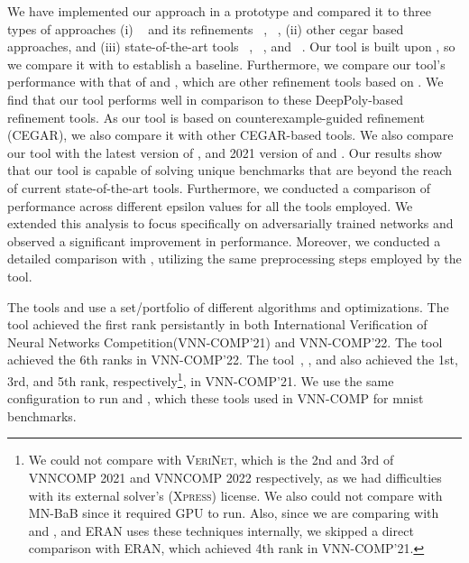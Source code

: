 We have implemented our approach in a prototype and compared it to three types of approaches 
(i) \deeppoly{}~\cite{singh2019abstract} and its refinements \kpoly{}~\cite{singh2019beyond}, \deepsrgr{}~\cite{yang2021improving}, 
(ii) other cegar based approaches, and 
(iii) state-of-the-art tools \alphabeta~\cite{zhang2018efficient,wang2021beta,xu2020fast,zhang2022branch,tjeng2017evaluating}, 
\ovaltool~\cite{bunel2018unified,bunel2020branch,bunel2020lagrangian,de2021scaling,de2021scaling,de2021scaling2,de2021improved}, 
and \marabou~\cite{katz2019marabou}. 
Our tool is built upon \deeppoly{}, so we compare it with \deeppoly{} to establish a baseline. 
Furthermore, we compare our tool's performance with that of \kpoly{} and \deepsrgr{}, 
which are other refinement tools based on \deeppoly{}. 
We find that our tool performs well in comparison to these DeepPoly-based refinement tools.
As our tool is based on counterexample-guided refinement (CEGAR), we also compare it with other CEGAR-based tools. 
We also compare our tool with the latest version of \alphabeta{}, and 2021 version of \ovaltool{} and \marabou{}. 
Our results show that our tool is capable of solving unique benchmarks 
that are beyond the reach of current state-of-the-art tools.
Furthermore, we conducted a comparison of performance across different epsilon values for all the tools employed. 
We extended this analysis to focus specifically on adversarially trained networks and observed a significant improvement 
in performance. Moreover, we conducted a detailed comparison with \alphabeta{}, 
utilizing the same preprocessing steps employed by the \alphabeta{} tool.

The tools \alphabeta{} and \ovaltool{} use a set/portfolio of different algorithms and optimizations.
The tool \alphabeta{} achieved the first rank persistantly in both International Verification of Neural Networks Competition(VNN-COMP'21) and VNN-COMP'22.
The tool \marabou{} achieved the 6th ranks in VNN-COMP'22.  
The tool~\alphabeta{}, \ovaltool{}, and \marabou{} also achieved the 1st, 3rd, and 5th rank, 
respectively\footnote{We could not compare with \textsc{VeriNet}, which is the 2nd and 3rd of VNNCOMP 2021 and VNNCOMP 2022 respectively, as we had difficulties with its external solver's (\textsc{Xpress}) license. We also
could not compare with MN-BaB since it required GPU to run.  
Also, since we are comparing with \deeppoly{} and \kpoly{}, and \textsc{ERAN} uses these techniques internally, we skipped a direct comparison with \textsc{ERAN}, which achieved 4th rank in VNN-COMP'21.}, 
in VNN-COMP'21. We use the same configuration to run \alphabeta{} and \ovaltool{}, which these tools
used in VNN-COMP for mnist benchmarks.   

